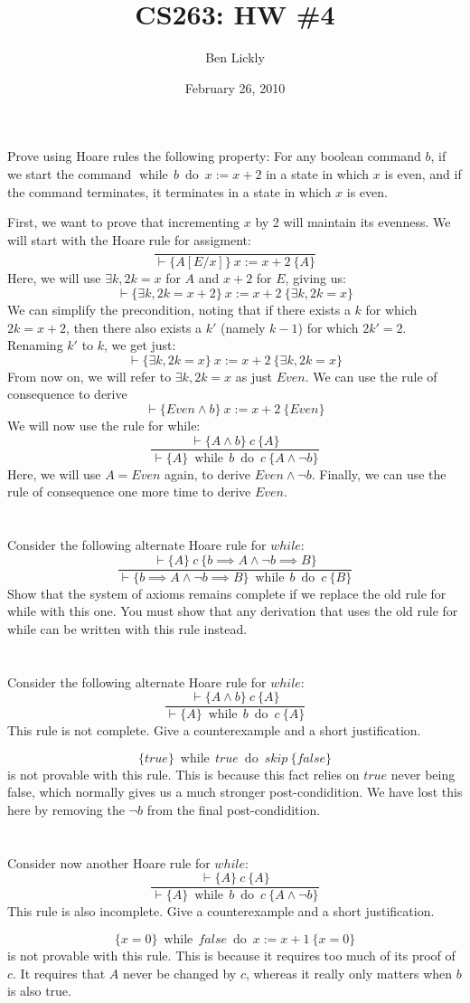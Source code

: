 \documentclass{article}
\title{CS263: HW \#4}
\author{Ben Lickly}
\date{February 26, 2010}
\newcommand{\problem}[1]
{\subsubsection*{} %
\vspace{-16pt} \section{} \vspace{-22pt} \qquad
#1%
\bigskip \bigskip
}
\newcommand{\while}[2]{\operatorname{while}\, #1\ \operatorname{do}\ #2}
\newcommand{\proves}{\vdash}
\newcommand{\axiomatic}[3]{\{#1\}\ #2\ \{#3\}}
\begin{document}
\maketitle

\problem{
Prove using Hoare rules the following property: For any boolean
command $b$, if we start the command $\while{b}{x := x + 2}$ in a state in
which $x$ is even, and if the command terminates, it terminates in a state in
which $x$ is even.
}
First, we want to prove that incrementing $x$ by 2 will maintain its evenness.
We will start with the Hoare rule for assigment:
\[
\frac{ }
{\proves \axiomatic{A[E/x]}{x := x + 2}{A}}
\]
Here, we will use $\exists k, 2k = x$ for $A$
and $x+2$ for $E$, giving us:
\[
\proves \axiomatic{\exists k, 2k = x + 2}{x := x + 2}{\exists k, 2k = x}
\]
We can simplify the precondition, noting that if there exists a $k$ for which
$2k = x +2$, then there also exists a $k'$ (namely $k-1$) for which $2k' = 2$.
Renaming $k'$ to $k$, we get just:
\[
\proves \axiomatic{\exists k, 2k = x}{x := x + 2}{\exists k, 2k = x}
\]
From now on, we will refer to $\exists k, 2k = x$ as just $Even$.
We can use the rule of consequence to derive
\[
\proves \axiomatic{Even \wedge b}{x := x + 2}{Even}
\]
We will now use the rule for while:
\[
\frac{\proves \axiomatic{A \wedge b}{c}{A}}
{\proves \axiomatic{A}{\while{b}{c}}{A \wedge \neg b}}
\]
Here, we will use $A = Even$ again, to derive $Even \wedge \neg b$.
Finally, we can use the rule of consequence one more time to derive $Even$.

\problem{Consider the following alternate Hoare rule for $while$:
\[
\frac{\proves \axiomatic{A}{c}{b \implies A \wedge \neg b \implies B}}
{\proves \axiomatic{b \implies A \wedge \neg b \implies B}{\while{b}{c}}{B}}
\]
    Show that the system of axioms remains complete if we replace the old
rule for while with this one. You must show that any derivation that uses
the old rule for while can be written with this rule instead.
}



\problem{Consider the following alternate Hoare rule for $while$:
\[
\frac{\proves \axiomatic{A \wedge b}{c}{A}}
{\proves \axiomatic{A}{\while{b}{c}}{A}}
\]
This rule is not complete. Give a counterexample and a short justification.
}

\[\axiomatic{true}{\while{true}{skip}}{false}\] is not provable with this rule. 
This is because this fact relies on $true$ never being false, which normally
gives us a much stronger post-condidition.  We have lost this here by removing
the $\neg b$ from the final post-condidition.

\problem{Consider now another Hoare rule for $while$:
\[
\frac{\proves \axiomatic{A}{c}{A}}
{\proves \axiomatic{A}{\while{b}{c}}{A \wedge \neg b}}
\]
This rule is also incomplete. Give a counterexample and a short justification.
}

\[\axiomatic{x=0}{\while{false}{x:=x+1}}{x=0}\] is not provable with this rule.
This is because it requires too much of its proof of $c$.  It requires that 
$A$ never be changed by $c$, whereas it really only matters when $b$ is also
true.
\end{document}
